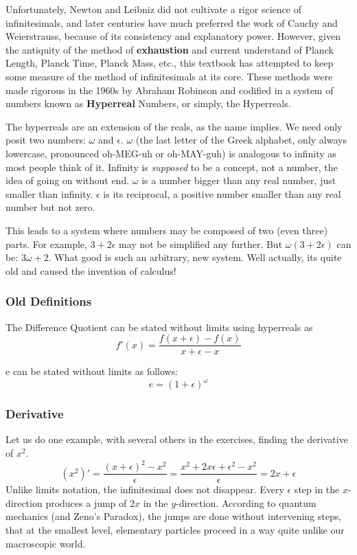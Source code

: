 Unfortunately, Newton and Leibniz did not cultivate a rigor science of infinitesimals,
and later centuries have much preferred the work of Cauchy and Weierstrauss, 
because of its consistency and explanatory power.  However, given the antiquity of
the method of \textbf{exhaustion} and current understand of Planck Length, 
Planck Time, Planck Mass, etc., this textbook has attempted to keep some measure
of the method of infinitesimals at its core.  These methods were made rigorous in
the 1960s by Abraham Robinson and codified in a system of numbers known as 
\textbf{Hyperreal} Numbers, or simply, the Hyperreals.

The hyperreals are an extension of the reals, as the name implies.  We need only
posit two numbers: $\omega$ and $\epsilon$.  $\omega$ (the last letter of the
Greek alphabet, only always lowercase, pronounced oh-MEG-uh or oh-MAY-guh)
is analogous to infinity as most people think of it.  Infinity is \emph{supposed}
to be a concept, not a number, the idea of going on without end.  $\omega$ is
a number bigger than any real number, just smaller than infinity.  $\epsilon$ is
its reciprocal, a positive number smaller than any real number but not zero.

This leads to a system where numbers may be composed of two (even three)
parts.  For example, $3+2\epsilon$ may not be simplified any further.  But 
$\omega(3+2\epsilon)$ can be: $3\omega + 2$.  What good is such an arbitrary,
new system.  Well actually, its quite old and caused the invention of calculus!

\subsubsection{Old Definitions}
The Difference Quotient can be stated without limits using hyperreals as
$$
f'(x) = \frac{f(x+\epsilon) - f(x)}{x+\epsilon -x}
$$

e can be stated without limits as follows:
$$
e = (1+\epsilon)^\omega
$$

\subsubsection{Derivative}
Let us do one example, with several others in the exercises, finding the derivative of 
$x^2$.
$$
(x^2)' = \frac{(x+\epsilon)^2-x^2}{\epsilon} = \frac{x^2+2x\epsilon+\epsilon^2-x^2}{\epsilon}
= 2x+\epsilon
$$
Unlike limits notation, the infinitesimal does not disappear.  Every $\epsilon$ step in
the $x$-direction produces a jump of $2x$ in the $y$-direction.  According to quantum
mechanics (and Zeno's Paradox), the jumps are done without intervening steps,
that at the smallest level, elementary particles proceed in a way quite unlike
our macroscopic world.
